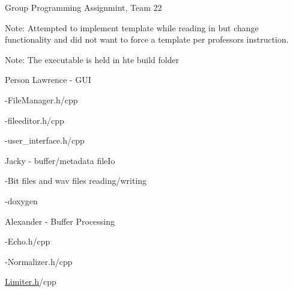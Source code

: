 Group Programming Assignmint, Team 22

Note\+: Attempted to implement template while reading in but change functionality and did not want to force a template per professors instruction.

Note\+: The executable is held in hte build folder

Person Lawrence -\/ G\+UI

-\/\+File\+Manager.\+h/cpp

-\/fileeditor.\+h/cpp

-\/user\+\_\+interface.\+h/cpp

Jacky -\/ buffer/metadata file\+Io

-\/Bit files and wav files reading/writing

-\/doxygen

Alexander -\/ Buffer Processing

-\/\+Echo.\+h/cpp

-\/\+Normalizer.\+h/cpp

\mbox{\hyperlink{Limiter_8h_source}{Limiter.\+h}}/cpp 